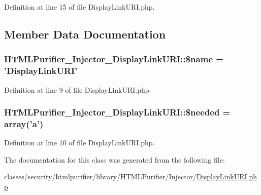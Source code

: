 Definition at line 15 of file Display\+Link\+U\+R\+I.\+php.



\subsection{Member Data Documentation}
\hypertarget{classHTMLPurifier__Injector__DisplayLinkURI_aae886996782515047aa0f0236efa4ed8}{
\subsubsection[{\$name}]{\setlength{\rightskip}{0pt plus 5cm}H\+T\+M\+L\+Purifier\+\_\+\+Injector\+\_\+\+Display\+Link\+U\+R\+I\+::\$name = 'Display\+Link\+U\+R\+I'}}\label{classHTMLPurifier__Injector__DisplayLinkURI_aae886996782515047aa0f0236efa4ed8}


Definition at line 9 of file Display\+Link\+U\+R\+I.\+php.

\hypertarget{classHTMLPurifier__Injector__DisplayLinkURI_a8aaf875d45aba11b54a9327c5ca9ad9e}{
\subsubsection[{\$needed}]{\setlength{\rightskip}{0pt plus 5cm}H\+T\+M\+L\+Purifier\+\_\+\+Injector\+\_\+\+Display\+Link\+U\+R\+I\+::\$needed = array('a')}}\label{classHTMLPurifier__Injector__DisplayLinkURI_a8aaf875d45aba11b54a9327c5ca9ad9e}


Definition at line 10 of file Display\+Link\+U\+R\+I.\+php.



The documentation for this class was generated from the following file\+:\begin{DoxyCompactItemize}
\item 
classes/security/htmlpurifier/library/\+H\+T\+M\+L\+Purifier/\+Injector/\hyperlink{DisplayLinkURI_8php}{Display\+Link\+U\+R\+I.\+php}\end{DoxyCompactItemize}
